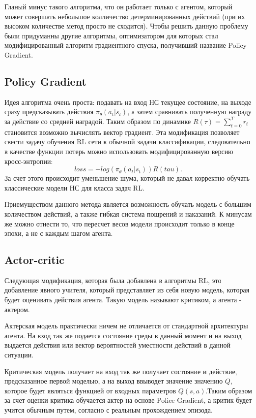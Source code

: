 \documentclass[bachelor, och, coursework]{shiza}
\begin{document}
Гланый минус такого алгоритма, что он работает только с агентом, который может совершать небольшое колличество детерминированных действий (при их высоком количестве метод просто не сходится).
Чтобы решить данную проблему были придуманны другие алгоритмы, оптимизатором для которых стал модифицированный алгоритм градиентного спуска, получивший название Policy Gradient.

\subsection{Policy Gradient}
Идея алгоритма очень проста: подавать на вход НС текущее состояние, на выходе сразу предсказывать действия $\pi_\theta(a_t|s_t)$, а затем сравнивать полученную награду за действие
со средней наградой. Таким образом по динамике $R(\tau) = \sum_{t=0}^T r_t$ становится возможно вычислять вектор градиент. Эта модификация позволяет свести задачу обучения RL сети к
обычной задачи классификации, следовательно в качестве функции потерь можно использовать модифицированную версию кросс-энтропии:
\begin{equation}
    loss = -log(\pi_\theta(a_t|s_t))R(tau).
\end{equation}
За счет этого происходит уменьшение шума, который не давал корректно обучать классические модели НС для класса задач RL.

Приемуществом данного метода является возможность обучать модель с большим количеством действий, а также гибкая система пощрений и наказаний. К минусам же можно отнести
то, что пересчет весов модели происходит только в конце эпохи, а не с каждым шагом агента.
\subsection{Actor-critic}
Следующая модификация, которая была добавлена в алгоритмы RL, это добавление явного учителя, который представляет из себя новую модель, которая будет оценивать действия
агента. Такую модель называют критиком, а агента - актером.

Актерская модель практически ничем не отличается от стандартной архитектуры агента. На вход так же подается состояние среды в данный момент и на выход выдается действия
или вектор вероятностей уместности действий в данной ситуации.

Критическая модель получает на вход так же получает состояние и действие, предсказанное первой моделью, а на выход ввыводет значение значению $Q$, которое будет
являться функцией от входных параметров $Q(s, a)$.Таким образом за счет оценки критика обучается актер на основе Police Gradient, а критик будет учится обычным
путем, согласно с реальным прохождением эпизода.
\end{document}
